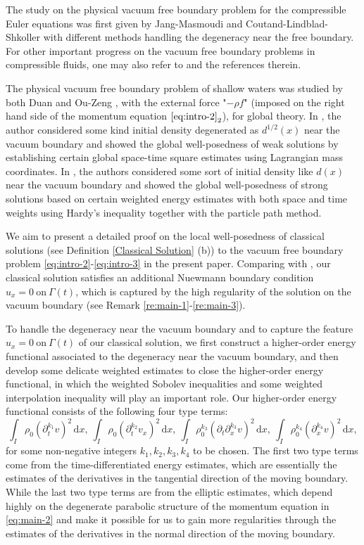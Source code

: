 \documentclass[11pt, reqno]{amsart}
\newcommand{\diff}{\mathrm{d}}
\numberwithin{equation}{section}
\begin{document}
The study on the physical vacuum free boundary problem for the compressible Euler equations was first given by Jang-Masmoudi \cite{MR2547977} and Coutand-Lindblad-Shkoller \cite{MR2608125} with different methods handling the degeneracy near the free boundary. For other important progress on the vacuum free boundary problems in compressible fluids, one may also refer to \cite{MR2177323, MR2779087,  MR2980528, MR3280249, MR3218831, MR3551252} and the references therein. 

 
The physical vacuum free boundary problem of shallow waters was studied by both Duan \cite{MR2914266} and Ou-Zeng \cite{MR3397339}, with the external force "\(-\rho f\)" (imposed on the right hand side of the momentum equation \(\eqref{eq:intro-2}_2\)), for global theory. In \cite{MR2914266}, the author considered some kind initial density degenerated as \(d^{1/2}(x)\) near the vacuum boundary and showed the global well-posedness of weak solutions by establishing certain global space-time square estimates using Lagrangian mass coordinates. In \cite{MR3397339}, the authors considered some sort of initial density like \(d(x)\) near the vacuum boundary and showed the global well-posedness of strong solutions based on certain weighted energy estimates with both space and time weights using Hardy's inequality together with the particle path method. 


We aim to present a detailed proof on the local well-posedness of classical solutions (see Definition \ref{Classical Solution} (b)) to the vacuum free boundary problem \eqref{eq:intro-2}-\eqref{eq:intro-3} in the present paper. Comparing with \cite{MR2914266, MR3397339}, our classical solution satisfies an additional Nuewmann boundary condition \(u_x=0\ \text{on}\ \Gamma(t)\), which is captured by the high regularity of the solution on the vacuum boundary (see Remark \ref{re:main-1}-\ref{re:main-3}). 

To handle the degeneracy near the vacuum boundary and to capture 
the feature \(u_x=0\ \text{on}\ \Gamma(t)\) of our classical solution, we first construct a higher-order energy functional associated to
the degeneracy near the vacuum boundary, and then develop some delicate weighted estimates to close the higher-order energy functional, in which the weighted Sobolev inequalities and some weighted interpolation inequality will play an important role.  Our higher-order energy functional consists of the following four type terms:
\[\int_I \rho_0(\partial_t^{k_1}v)^2\,\diff x,\
\int_I \rho_0(\partial_t^{k_2}v_x)^2\,\diff x,\
\int_I \rho_0^{k_3}(\partial_t\partial_x^{k_3}v)^2\,\diff x,\
\int_I \rho_0^{k_4}(\partial_x^{k_4}v)^2\,\diff x,\]
for some non-negative integers \(k_1, k_2, k_3, k_4\) to be chosen. The first two type terms come from the time-differentiated energy estimates, which are essentially the estimates of the derivatives
in the tangential direction of the moving boundary. 
While the last two type terms are from the elliptic estimates, which depend highly on the degenerate parabolic structure of the momentum equation in \eqref{eq:main-2} and make it possible for us to gain more regularities through the estimates of the derivatives in the normal direction of the moving boundary. 
\end{document}
